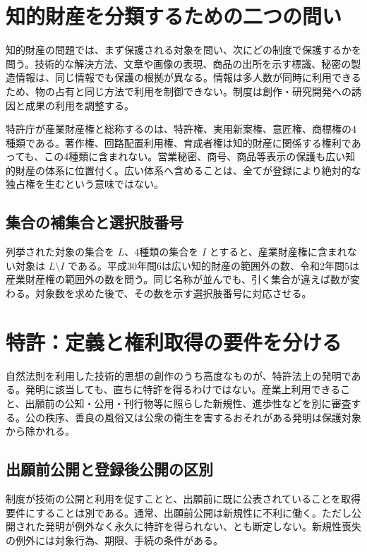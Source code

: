 \section{知的財産を分類するための二つの問い}
\label{theory:ip:scope}
知的財産の問題では、まず保護される対象を問い、次にどの制度で保護するかを問う。技術的な解決方法、文章や画像の表現、商品の出所を示す標識、秘密の製造情報は、同じ情報でも保護の根拠が異なる。情報は多人数が同時に利用できるため、物の占有と同じ方法で利用を制御できない。制度は創作・研究開発への誘因と成果の利用を調整する。

特許庁が産業財産権と総称するのは、特許権、実用新案権、意匠権、商標権の4種類である\parencite{ip_industrial_four}。著作権、回路配置利用権、育成者権は知的財産に関係する権利であっても、この4種類に含まれない。営業秘密、商号、商品等表示の保護も広い知的財産の体系に位置付く\parencite{ip_basic_act,ip_broad_scope}。広い体系へ含めることは、全てが登録により絶対的な独占権を生むという意味ではない。

\subsection{集合の補集合と選択肢番号}
\label{theory:ip:count}
列挙された対象の集合を \(L\)、4種類の集合を \(I\) とすると、産業財産権に含まれない対象は \(L\setminus I\) である。平成30年問6は広い知的財産の範囲外の数、令和2年問5は産業財産権の範囲外の数を問う。同じ名称が並んでも、引く集合が違えば数が変わる。対象数を求めた後で、その数を示す選択肢番号に対応させる。

\section{特許：定義と権利取得の要件を分ける}
\label{theory:ip:patent}
自然法則を利用した技術的思想の創作のうち高度なものが、特許法上の発明である。発明に該当しても、直ちに特許を得るわけではない。産業上利用できること、出願前の公知・公用・刊行物等に照らした新規性、進歩性などを別に審査する。公の秩序、善良の風俗又は公衆の衛生を害するおそれがある発明は保護対象から除かれる\parencite{ip_patent_statute}。

\subsection{出願前公開と登録後公開の区別}
\label{theory:ip:novelty}
制度が技術の公開と利用を促すことと、出願前に既に公表されていることを取得要件にすることは別である。通常、出願前公開は新規性に不利に働く。ただし公開された発明が例外なく永久に特許を得られない、とも断定しない。新規性喪失の例外には対象行為、期限、手続の条件がある。


